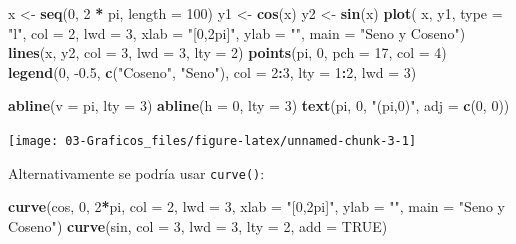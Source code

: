 \documentclass[]{book}
\newenvironment{Shaded}{\begin{snugshade}}{\end{snugshade}}
\newcommand{\DataTypeTok}[1]{\textcolor[rgb]{0.13,0.29,0.53}{#1}}
\newcommand{\DecValTok}[1]{\textcolor[rgb]{0.00,0.00,0.81}{#1}}
\newcommand{\FloatTok}[1]{\textcolor[rgb]{0.00,0.00,0.81}{#1}}
\newcommand{\KeywordTok}[1]{\textcolor[rgb]{0.13,0.29,0.53}{\textbf{#1}}}
\newcommand{\NormalTok}[1]{#1}
\newcommand{\OperatorTok}[1]{\textcolor[rgb]{0.81,0.36,0.00}{\textbf{#1}}}
\newcommand{\OtherTok}[1]{\textcolor[rgb]{0.56,0.35,0.01}{#1}}
\newcommand{\StringTok}[1]{\textcolor[rgb]{0.31,0.60,0.02}{#1}}
\begin{document}
\begin{Shaded}
\begin{Highlighting}[]
\NormalTok{x <-}\StringTok{ }\KeywordTok{seq}\NormalTok{(}\DecValTok{0}\NormalTok{, }\DecValTok{2} \OperatorTok{*}\StringTok{ }\NormalTok{pi, }\DataTypeTok{length =} \DecValTok{100}\NormalTok{)}
\NormalTok{y1 <-}\StringTok{ }\KeywordTok{cos}\NormalTok{(x)}
\NormalTok{y2 <-}\StringTok{ }\KeywordTok{sin}\NormalTok{(x)}
\KeywordTok{plot}\NormalTok{( x, y1, }\DataTypeTok{type =} \StringTok{"l"}\NormalTok{, }\DataTypeTok{col =} \DecValTok{2}\NormalTok{, }\DataTypeTok{lwd =} \DecValTok{3}\NormalTok{, }\DataTypeTok{xlab =} \StringTok{"[0,2pi]"}\NormalTok{, }\DataTypeTok{ylab =} \StringTok{""}\NormalTok{, }\DataTypeTok{main =} \StringTok{"Seno y Coseno"}\NormalTok{)}
\KeywordTok{lines}\NormalTok{(x, y2, }\DataTypeTok{col =} \DecValTok{3}\NormalTok{, }\DataTypeTok{lwd =} \DecValTok{3}\NormalTok{, }\DataTypeTok{lty =} \DecValTok{2}\NormalTok{)}
\KeywordTok{points}\NormalTok{(pi, }\DecValTok{0}\NormalTok{, }\DataTypeTok{pch =} \DecValTok{17}\NormalTok{, }\DataTypeTok{col =} \DecValTok{4}\NormalTok{)}
\KeywordTok{legend}\NormalTok{(}\DecValTok{0}\NormalTok{, }\FloatTok{-0.5}\NormalTok{, }\KeywordTok{c}\NormalTok{(}\StringTok{"Coseno"}\NormalTok{, }\StringTok{"Seno"}\NormalTok{), }\DataTypeTok{col =} \DecValTok{2}\OperatorTok{:}\DecValTok{3}\NormalTok{, }\DataTypeTok{lty =} \DecValTok{1}\OperatorTok{:}\DecValTok{2}\NormalTok{, }\DataTypeTok{lwd =} \DecValTok{3}\NormalTok{)}

\KeywordTok{abline}\NormalTok{(}\DataTypeTok{v =}\NormalTok{ pi, }\DataTypeTok{lty =} \DecValTok{3}\NormalTok{)}
\KeywordTok{abline}\NormalTok{(}\DataTypeTok{h =} \DecValTok{0}\NormalTok{, }\DataTypeTok{lty =} \DecValTok{3}\NormalTok{)}
\KeywordTok{text}\NormalTok{(pi, }\DecValTok{0}\NormalTok{, }\StringTok{"(pi,0)"}\NormalTok{, }\DataTypeTok{adj =} \KeywordTok{c}\NormalTok{(}\DecValTok{0}\NormalTok{, }\DecValTok{0}\NormalTok{))}
\end{Highlighting}
\end{Shaded}

\begin{center}\texttt{[image: 03-Graficos\_files/figure-latex/unnamed-chunk-3-1]} \end{center}

Alternativamente se podría usar \texttt{curve()}:

\begin{Shaded}
\begin{Highlighting}[]
\KeywordTok{curve}\NormalTok{(cos, }\DecValTok{0}\NormalTok{, }\DecValTok{2}\OperatorTok{*}\NormalTok{pi, }\DataTypeTok{col =} \DecValTok{2}\NormalTok{, }\DataTypeTok{lwd =} \DecValTok{3}\NormalTok{, }
      \DataTypeTok{xlab =} \StringTok{"[0,2pi]"}\NormalTok{, }\DataTypeTok{ylab =} \StringTok{""}\NormalTok{, }\DataTypeTok{main =} \StringTok{"Seno y Coseno"}\NormalTok{)}
\KeywordTok{curve}\NormalTok{(sin, }\DataTypeTok{col =} \DecValTok{3}\NormalTok{, }\DataTypeTok{lwd =} \DecValTok{3}\NormalTok{, }\DataTypeTok{lty =} \DecValTok{2}\NormalTok{, }\DataTypeTok{add =} \OtherTok{TRUE}\NormalTok{)}
\end{Highlighting}
\end{Shaded}
\end{document}
